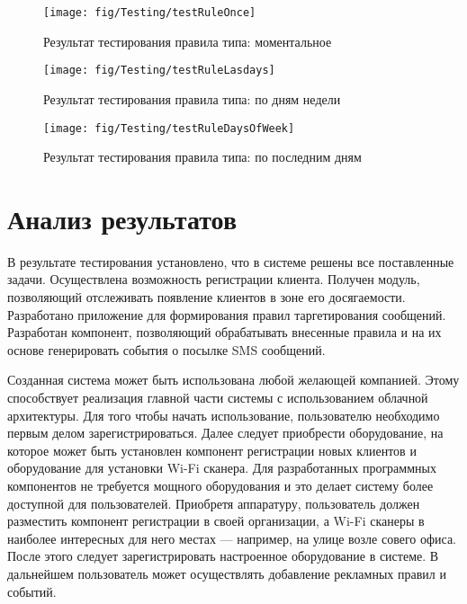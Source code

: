 \begin{figure}[h]
	\centering
	\texttt{[image: fig/Testing/testRuleOnce]}
	\caption{Результат тестирования правила типа: моментальное}
	\label{fig:testRuleOnce}
\end{figure}

\begin{figure}[h]
	\centering
	\texttt{[image: fig/Testing/testRuleLasdays]}
	\caption{Результат тестирования правила типа: по дням недели}
	\label{fig:testRuleLasdays}
\end{figure}

\begin{figure}[h]
	\centering
	\texttt{[image: fig/Testing/testRuleDaysOfWeek]}
	\caption{Результат тестирования правила типа: по последним дням}
	\label{fig:testRuleDaysOfWeek}
\end{figure}

\section{Анализ результатов}

В результате тестирования установлено, что в системе решены все поставленные задачи. Осуществлена возможность регистрации клиента. Получен модуль, позволяющий отслеживать появление клиентов в зоне его досягаемости. Разработано приложение для формирования правил таргетирования сообщений. Разработан компонент, позволяющий обрабатывать внесенные правила и на их основе генерировать события о посылке SMS сообщений.

Созданная система может быть использована любой желающей компанией. Этому способствует реализация главной части системы с использованием облачной архитектуры. Для того чтобы начать использование, пользователю необходимо первым делом зарегистрироваться. Далее следует приобрести оборудование, на которое может быть установлен компонент регистрации новых клиентов и оборудование для установки Wi-Fi сканера. Для разработанных программных компонентов не требуется мощного оборудования и это делает систему более доступной для пользователей. Приобретя аппаратуру, пользователь должен разместить компонент регистрации в своей организации, а Wi-Fi сканеры в наиболее интересных для него местах --- например, на улице возле совего офиса. После этого следует зарегистрировать настроенное оборудование в системе. В дальнейшем пользователь может осуществлять добавление рекламных правил и событий.

